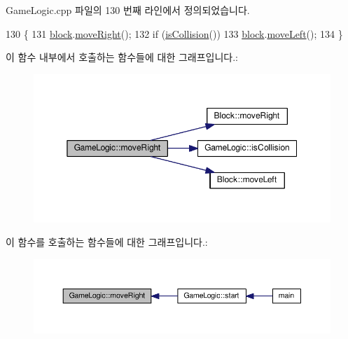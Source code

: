 Game\+Logic.\+cpp 파일의 130 번째 라인에서 정의되었습니다.


\begin{DoxyCode}
130                           \{
131     \hyperlink{class_game_logic_a499d9b05317bb6a77bf3521f42a6638a}{block}.\hyperlink{class_block_a13d1f87524fed8d686a4d478e41d5096}{moveRight}();
132     \textcolor{keywordflow}{if} (\hyperlink{class_game_logic_a1c534033fe42c8af4fb0e11e3fed2cfa}{isCollision}())
133         \hyperlink{class_game_logic_a499d9b05317bb6a77bf3521f42a6638a}{block}.\hyperlink{class_block_af304df3662f2c6feec7cfc232246ef29}{moveLeft}();
134 \}
\end{DoxyCode}


이 함수 내부에서 호출하는 함수들에 대한 그래프입니다.\+:
\nopagebreak
\begin{figure}[H]
\begin{center}
\leavevmode
\includegraphics[width=350pt]{class_game_logic_a6213333800f3aa800ea448ad3ee3ea7c_cgraph}
\end{center}
\end{figure}




이 함수를 호출하는 함수들에 대한 그래프입니다.\+:
\nopagebreak
\begin{figure}[H]
\begin{center}
\leavevmode
\includegraphics[width=350pt]{class_game_logic_a6213333800f3aa800ea448ad3ee3ea7c_icgraph}
\end{center}
\end{figure}


